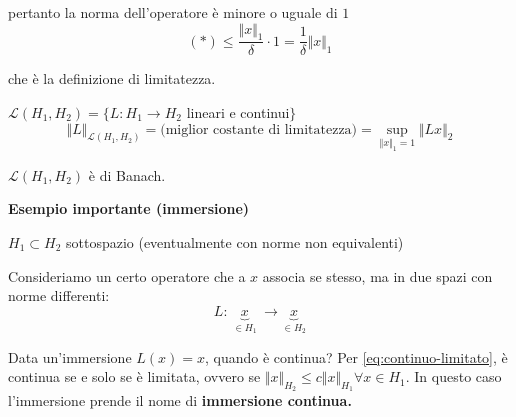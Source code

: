 \begin{dimostrazione}
\begin{itemize}
              pertanto la norma dell'operatore è minore o uguale di $1$
              \begin{equation*}
                  (*) \leq \frac{\Vert x\Vert _{1}}{\delta } \cdotp 1=\frac{1}{\delta }\Vert x\Vert _{1}
              \end{equation*}

              che è la definizione di limitatezza.
    \end{itemize}

\end{dimostrazione}
\begin{definition}
    $\mathcal{L}(H_{1},H_{2}) =\{L:H_{1}\rightarrow H_{2}$ lineari e continui$\}$
    \begin{equation*}
        \Vert L\Vert _{\mathcal{L}(H_{1},H_{2})} =\text{(miglior costante di limitatezza)} =\sup _{\Vert x\Vert _{1} =1}\Vert Lx\Vert _{2}
    \end{equation*}
\end{definition}
\begin{theorem}
    $\displaystyle \mathcal{L}(H_{1},H_{2})$ è di Banach.
\end{theorem}
\textbf{Esempio importante (immersione)}

$\displaystyle H_{1} \subset H_{2}$ sottospazio (eventualmente con norme non equivalenti)

Consideriamo un certo operatore che a $x$ associa se stesso, ma in due spazi con norme differenti:
\begin{equation*}
    L:\ \underbrace{x}_{\in H_{1}} \ \rightarrow \underbrace{x}_{\in H_{2}}
\end{equation*}

Data un'immersione $\displaystyle L(x) =x$, quando è continua? Per \eqref{eq:continuo-limitato}, è continua se e solo se è limitata, ovvero se $\displaystyle \Vert x\Vert _{H_{2}} \leq c\Vert x\Vert _{H_{1}} \forall x\in H_{1}$. In questo caso l'immersione prende il nome di \textbf{immersione continua.}

